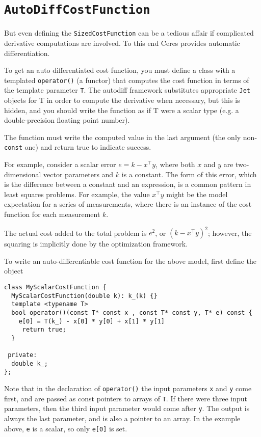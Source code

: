\section{\texttt{AutoDiffCostFunction}}
But even defining the \texttt{SizedCostFunction} can be a tedious affair if complicated derivative computations are involved. To this end Ceres provides automatic differentiation.

To get an auto differentiated cost function, you must define a class with a
 templated \texttt{operator()} (a functor) that computes the cost function in terms of
 the template parameter \texttt{T}. The autodiff framework substitutes appropriate
 \texttt{Jet} objects for T in order to compute the derivative when necessary, but
 this is hidden, and you should write the function as if T were a scalar type
 (e.g. a double-precision floating point number).

 The function must write the computed value in the last argument (the only
 non-\texttt{const} one) and return true to indicate success.

 For example, consider a scalar error $e = k - x^\top y$, where both $x$ and $y$ are
 two-dimensional vector parameters  and $k$ is a constant. The form of this error, which is the
 difference between a constant and an expression, is a common pattern in least
 squares problems. For example, the value $x^\top y$ might be the model expectation
 for a series of measurements, where there is an instance of the cost function
 for each measurement $k$.

 The actual cost added to the total problem is $e^2$, or $(k - x^\top y)^2$; however,
 the squaring is implicitly done by the optimization framework.

 To write an auto-differentiable cost function for the above model, first
 define the object
\begin{verbatim}
class MyScalarCostFunction {
  MyScalarCostFunction(double k): k_(k) {}
  template <typename T>
  bool operator()(const T* const x , const T* const y, T* e) const {
    e[0] = T(k_) - x[0] * y[0] + x[1] * y[1]
     return true;
  }

 private:
  double k_;
};
\end{verbatim}
 
Note that in the declaration of \texttt{operator()} the input parameters \texttt{x} and \texttt{y} come
 first, and are passed as const pointers to arrays of \texttt{T}. If there were three
 input parameters, then the third input parameter would come after \texttt{y}. The
 output is always the last parameter, and is also a pointer to an array. In
 the example above, \texttt{e} is a scalar, so only \texttt{e[0]} is set.

